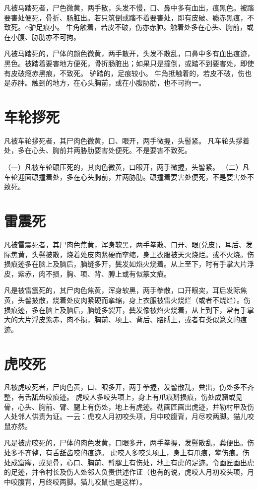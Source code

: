 \documentclass[12pt,UTF8]{ctexbook}
\begin{document}
凡被马踏死者，尸色微黄，两手散，头发不慢，口、鼻中多有血出，痕黑色。被踏要害处便死，骨折、肠脏出。若只筑倒或踏不着要害处，即有皮破、瘾赤黑痕，不致死。○驴足痕小。
牛角触着，若皮不破，伤亦赤肿。触着处多在心头、胸前，或在小腹、胁肋亦不可拘。


凡被马踏死的，尸体的颜色微黄，两手散开，头发不散乱，口鼻中多有血出痕迹，黑色。被踏着要害地方便死，骨折肠脏出；如果只是撞倒，或踏不到要害处，即使有皮破瘾赤黑痕，不致死。
驴踏的，足痕较小。
牛角抵触着的，若皮不破，伤也是赤肿。触到的地方，在心头胸前，或在小腹胁肋，也不可拘一。


\chapter{车轮拶死}

凡被车轮拶死者，其尸肉色微黄，口、眼开，两手微握，头髻紧。
凡车轮头拶着处，多在心头、胸前并两胁肋要害处便死。不是要害不致死。



（一）凡被车轮碾压死的，其肉色微黄，口眼开，两手微握，头髻紧。
（二）凡车轮迎面碾撞着处，多在心头胸前，并两胁肋。碾撞着要害处便死，不是要害处不致死。


\chapter{雷震死}
凡被雷震死者，其尸肉色焦黄，浑身软黑，两手拳散、口开、眼(兑皮)，耳后、发际焦黄，头髻披散，烧着处皮肉紧硬而挛缩，身上衣服被天火烧烂。或不火烧。伤损痕迹多在脑上及脑后，脑缝多开，鬓发如焰火烧着。从上至下，时有手掌大片浮皮，紫赤，肉不损，胸、项、背、膊上或有似篆文痕。


凡是被雷震死的，其尸肉色焦黄，浑身软黑，两手拳散，口开眼突，耳后发际焦黄，头髻披散，烧着处皮肉紧硬而挛缩，身上衣服被雷火烧烂（或者不烧烂）。伤损痕迹，多在脑上及脑后，脑缝多裂开，鬓发像被焰火烧着，从上到下，常有手掌大的大片浮皮紫赤，肉不损，胸前、项上、背后、胳膊上，或者有类似篆文的痕迹。


\chapter{虎咬死}
凡被虎咬死者，尸肉色黄，口、眼多开，两手拳握，发髻散乱，粪出，伤处多不齐整，有舌舐齿咬痕迹。
虎咬人多咬头项上，身上有爪痕掰损痕，伤处成窟或见骨，心头、胸前、臂、腿上有伤处，地上有虎迹。勒画匠画出虎迹，并勒村甲及伤人处邻人供责为证。一云：虎咬人月初咬头项，月中咬腹背，月尽咬两脚。猫儿咬鼠亦然。


凡是被虎咬死的，尸体的肉色发黄，口眼多开，两手拳握，发髻散乱，粪便出。伤处多不齐整，有舌舐齿咬的痕迹。
虎咬人多咬头项上，身上有爪痕，攀伤痕。伤处成窟窿，或见骨，心口、胸前、臂腿上有伤处，地上有虎的足迹。令画匠画出虎的足迹，并令村长及伤人处邻人负责供述作证（也有的说，虎咬人月初咬头项，月中咬腹背，月终咬两脚。猫儿咬鼠也是这样）。
\end{document}
